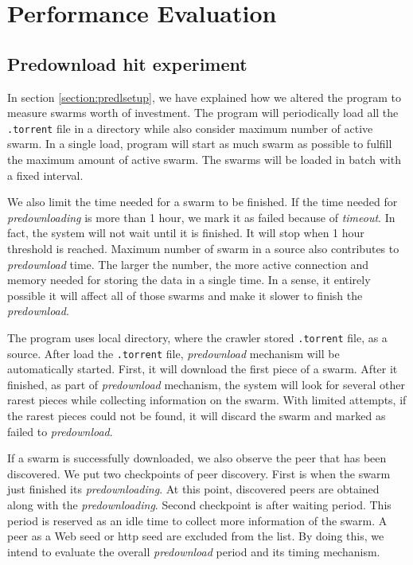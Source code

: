 \chapter{Performance Evaluation}
\label{chp:perfeval}

\section{Predownload hit experiment}
In section \ref{section:predlsetup}, we have explained how we altered the program to measure swarms worth of investment. The program will periodically load all the \texttt{.torrent} file in a directory while also consider maximum number of active swarm. In a single load, program will start as much swarm as possible to fulfill the maximum amount of active swarm. The swarms will be loaded in batch with a fixed interval. 

We also limit the time needed for a swarm to be finished. If the time needed for \textit{predownloading} is more than 1 hour, we mark it as failed because of \textit{timeout}. In fact, the system will not wait until it is finished. It will stop when 1 hour threshold is reached. Maximum number of swarm in a source also contributes to \textit{predownload} time. The larger the number, the more active connection and memory needed for storing the data in a single time. In a sense, it entirely possible it will affect all of those swarms and make it slower to finish the \textit{predownload}.

The program uses local directory, where the crawler stored \texttt{.torrent} file, as a source. After load the \texttt{.torrent} file, \textit{predownload} mechanism will be automatically started. First, it will download the first piece of a swarm. After it finished, as part of \textit{predownload} mechanism, the system will look for several other rarest pieces while collecting information on the swarm. With limited attempts, if the rarest pieces could not be found, it will discard the swarm and marked as failed to \textit{predownload}. 

If a swarm is successfully downloaded, we also observe the peer that has been discovered. We put two checkpoints of peer discovery. First is when the swarm just finished its \textit{predownloading}. At this point, discovered peers are obtained along with the \textit{predownloading}. Second checkpoint is after waiting period. This period is reserved as an idle time to collect more information of the swarm. A peer as a Web seed or http seed are excluded from the list. By doing this, we intend to evaluate the overall \textit{predownload} period and its timing mechanism.

